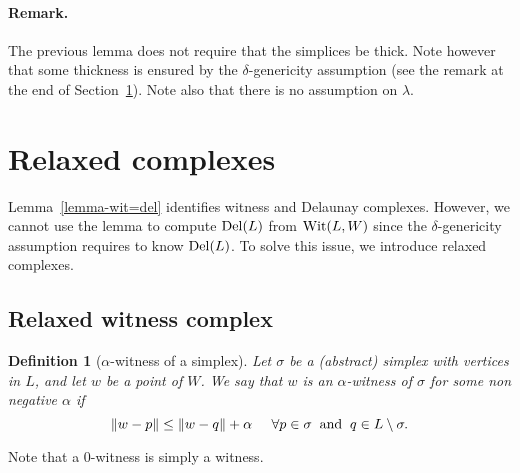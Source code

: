 \documentclass[11pt,a4paper]{article}
\newtheorem{definition}{Definition}
\newcommand{\e}{\varepsilon}
\newcommand{\del}{{\rm Del}}
\newcommand{\wit}{{\rm Wit}}
\begin{document}


\paragraph{Remark.} The previous lemma does not require that the
simplices be thick. Note however that some thickness is ensured by the
$\delta$-genericity assumption \cite{boissonnat:hal-00807050} (see  the remark at the
end of Section~\ref{sec:relaxed}). Note also that there
is no assumption on $\lambda$. 

\section{Relaxed complexes}
\label{sec:relaxed}

Lemma~\ref{lemma-wit=del} identifies witness and Delaunay
complexes. However, we cannot use the lemma to compute $\del (L)$ from
$\wit (L,W)$ since the $\delta$-genericity assumption requires to know
$\del (L)$. To solve this issue,  we introduce relaxed complexes.

\subsection{Relaxed witness complex}

\begin{definition}[$\alpha$-witness of a simplex]
  Let $\sigma$ be a (abstract)  simplex with vertices in $L$, and let $w$ be a point
  of $W$. We say that $w$ is an $\alpha$-witness of $\sigma$ for some
  non negative $\alpha$ if $$\| w-p\|
  \leq \| w -q \| + \alpha \;\;\;\;\;  \forall p\in
  \sigma\;\; {\rm  and}\;\; q\in L\setminus
  \sigma.$$
\end{definition}

Note that a $0$-witness is simply a witness.

\end{document}
